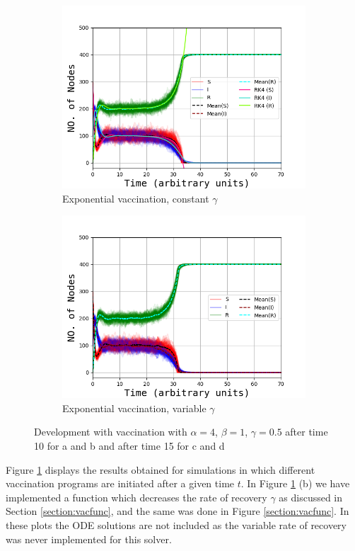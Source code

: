 \begin{figure}[H]
\begin{subfigure}{0.49\linewidth}
			\includegraphics[width=1.1\linewidth]{Figures/Vax_expt_15x03_ckonst_4_1_05.png}
			\caption{Exponential vaccination, constant $\gamma$}
		\end{subfigure}
		\begin{subfigure}{0.49\linewidth}
		    \includegraphics[width=1.1\linewidth]{Figures/Vax_expt_15x03_cvar_4_1_05.png}
			\caption{Exponential vaccination, variable $\gamma$}
		\end{subfigure}
		\caption{Development with vaccination with $\alpha = 4$, $\beta = 1$, $\gamma=0.5$ after time 10 for a and b and after time 15 for c and d}
		\label{fig:vaccinationvar}
	\end{figure}

Figure \ref{fig:vaccinationvar} displays the results obtained for simulations in which different vaccination programs are initiated after a given time $t$. In Figure \ref{fig:vaccinationvar} (b) we have implemented a function which decreases the rate of recovery $\gamma$ as discussed in Section \ref{section:vacfunc}, and the same was done in Figure \ref{section:vacfunc}. In these plots the ODE solutions are not included as the variable rate of recovery was never implemented for this solver. 

